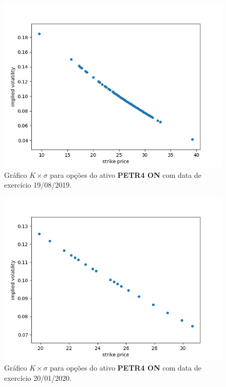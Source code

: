 \documentclass{article}
\begin{document}
\begin{figure}[]
	\includegraphics[width=0.9\linewidth]{Figure_1.png}
	\centering
	
	\caption{Gráfico $K \times \sigma$ para opções do ativo \textbf{PETR4 ON} com data de exercício 19/08/2019.}
	\label{}
\end{figure}

\begin{figure}[]
	\includegraphics[width=0.9\linewidth]{Figure_2.png}
	\centering
	
	\caption{Gráfico $K \times \sigma$ para opções do ativo \textbf{PETR4 ON} com data de exercício 20/01/2020.}
	\label{}
\end{figure}

\end{document}
